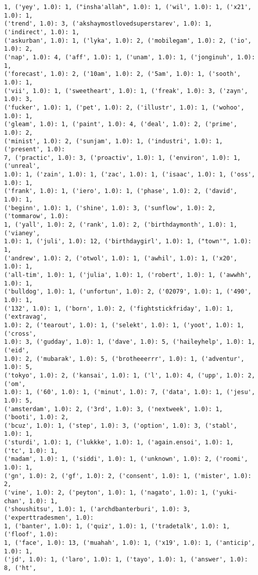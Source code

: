\documentclass[11pt]{article}
\begin{document}
\begin{Verbatim}[commandchars=\\\{\}]
1, ('yey', 1.0): 1, ("insha'allah", 1.0): 1, ('wil', 1.0): 1, ('x21', 1.0): 1,
('trend', 1.0): 3, ('akshaymostlovedsuperstarev', 1.0): 1, ('indirect', 1.0): 1,
('askurban', 1.0): 1, ('lyka', 1.0): 2, ('mobilegam', 1.0): 2, ('io', 1.0): 2,
('nap', 1.0): 4, ('aff', 1.0): 1, ('unam', 1.0): 1, ('jonginuh', 1.0): 1,
('forecast', 1.0): 2, ('10am', 1.0): 2, ('5am', 1.0): 1, ('sooth', 1.0): 1,
('vii', 1.0): 1, ('sweetheart', 1.0): 1, ('freak', 1.0): 3, ('zayn', 1.0): 3,
('fucker', 1.0): 1, ('pet', 1.0): 2, ('illustr', 1.0): 1, ('wohoo', 1.0): 1,
('gleam', 1.0): 1, ('paint', 1.0): 4, ('deal', 1.0): 2, ('prime', 1.0): 2,
('minist', 1.0): 2, ('sunjam', 1.0): 1, ('industri', 1.0): 1, ('present', 1.0):
7, ('practic', 1.0): 3, ('proactiv', 1.0): 1, ('environ', 1.0): 1, ('unreal',
1.0): 1, ('zain', 1.0): 1, ('zac', 1.0): 1, ('isaac', 1.0): 1, ('oss', 1.0): 1,
('frank', 1.0): 1, ('iero', 1.0): 1, ('phase', 1.0): 2, ('david', 1.0): 1,
('beginn', 1.0): 1, ('shine', 1.0): 3, ('sunflow', 1.0): 2, ('tommarow', 1.0):
1, ('yall', 1.0): 2, ('rank', 1.0): 2, ('birthdaymonth', 1.0): 1, ('vianey',
1.0): 1, ('juli', 1.0): 12, ('birthdaygirl', 1.0): 1, ("town'", 1.0): 1,
('andrew', 1.0): 2, ('otwol', 1.0): 1, ('awhil', 1.0): 1, ('x20', 1.0): 1,
('all-tim', 1.0): 1, ('julia', 1.0): 1, ('robert', 1.0): 1, ('awwhh', 1.0): 1,
('bulldog', 1.0): 1, ('unfortun', 1.0): 2, ('02079', 1.0): 1, ('490', 1.0): 1,
('132', 1.0): 1, ('born', 1.0): 2, ('fightstickfriday', 1.0): 1, ('extravag',
1.0): 2, ('tearout', 1.0): 1, ('selekt', 1.0): 1, ('yoot', 1.0): 1, ('cross',
1.0): 3, ('gudday', 1.0): 1, ('dave', 1.0): 5, ('haileyhelp', 1.0): 1, ('eid',
1.0): 2, ('mubarak', 1.0): 5, ('brotheeerrr', 1.0): 1, ('adventur', 1.0): 5,
('tokyo', 1.0): 2, ('kansai', 1.0): 1, ('l', 1.0): 4, ('upp', 1.0): 2, ('om',
1.0): 1, ('60', 1.0): 1, ('minut', 1.0): 7, ('data', 1.0): 1, ('jesu', 1.0): 5,
('amsterdam', 1.0): 2, ('3rd', 1.0): 3, ('nextweek', 1.0): 1, ('booti', 1.0): 2,
('bcuz', 1.0): 1, ('step', 1.0): 3, ('option', 1.0): 3, ('stabl', 1.0): 1,
('sturdi', 1.0): 1, ('lukkke', 1.0): 1, ('again.ensoi', 1.0): 1, ('tc', 1.0): 1,
('madam', 1.0): 1, ('siddi', 1.0): 1, ('unknown', 1.0): 2, ('roomi', 1.0): 1,
('gn', 1.0): 2, ('gf', 1.0): 2, ('consent', 1.0): 1, ('mister', 1.0): 2,
('vine', 1.0): 2, ('peyton', 1.0): 1, ('nagato', 1.0): 1, ('yuki-chan', 1.0): 1,
('shoushitsu', 1.0): 1, ('archdbanterburi', 1.0): 3, ('experttradesmen', 1.0):
1, ('banter', 1.0): 1, ('quiz', 1.0): 1, ('tradetalk', 1.0): 1, ('floof', 1.0):
1, ('face', 1.0): 13, ('muahah', 1.0): 1, ('x19', 1.0): 1, ('anticip', 1.0): 1,
('jd', 1.0): 1, ('laro', 1.0): 1, ('tayo', 1.0): 1, ('answer', 1.0): 8, ('ht',

\end{Verbatim}
\end{document}
